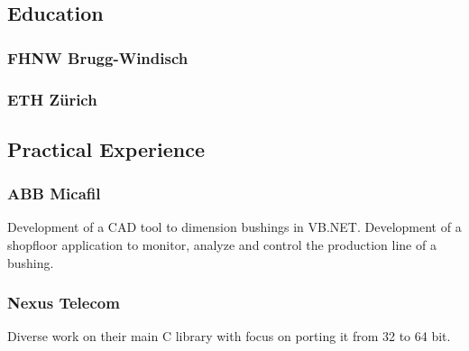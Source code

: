     \begin{timeline}
    
    
    \subsection{Education}
    
    \subsubsection{FHNW Brugg-Windisch}
    \sectionsep
    
    \subsubsection{ETH Zürich}
    \sectionsep
    
    
    \subsection{Practical Experience}
    
    \subsubsection{ABB Micafil}
    Development of a CAD tool to dimension bushings in VB.NET.
    Development of a shopfloor application to monitor, analyze and control the production line of a bushing.
    \sectionsep
    
    \subsubsection{Nexus Telecom}
    Diverse work on their main C library with focus on porting it from 32 to 64 bit.
    \sectionsep

    

\end{timeline}
